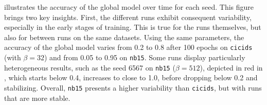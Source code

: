  illustrates the accuracy of the global model over time for each seed.
This figure brings two key insights.
First, the different runs exhibit consequent variability, especially in the early stages of training.
This is true for the runs themselves, but also for between runs on the same datasets.
Using the same parameters, the accuracy of the global model varies from 0.2 to 0.8 after 100 epochs on \texttt{cicids} (with $\beta=32$) and from 0.05 to 0.95 on \texttt{nb15}.
Some runs display particularly heterogeneous results, such as the seed 6567 on \texttt{nb15} ($\beta=512$), depicted in red in , which starts below 0.4, increases to close to 1.0, before dropping below 0.2 and stabilizing.
Overall, \texttt{nb15} presents a higher variability than \texttt{cicids}, but with runs that are more stable.


